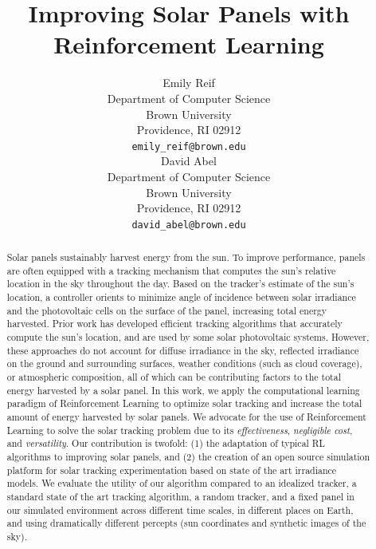 \documentclass[11pt]{article}
\title{Improving Solar Panels with Reinforcement Learning}
\author{
Emily Reif \\
Department of Computer Science\\
Brown University\\
Providence, RI 02912 \\
\texttt{emily\_reif@brown.edu} \\
\And
David Abel \\
Department of Computer Science\\
Brown University \\
Providence, RI 02912 \\
\texttt{david\_abel@brown.edu} \\
}
\date{}
\begin{document}
\maketitle

\begin{abstract}
Solar panels sustainably harvest energy from the sun. To improve performance, panels are often equipped with a tracking mechanism that computes the sun's relative location in the sky throughout the day. Based on the tracker's estimate of the sun's location, a controller orients to minimize angle of incidence between solar irradiance and the photovoltaic cells on the surface of the panel, increasing total energy harvested. Prior work has developed efficient tracking algorithms that accurately compute the sun's location, and are used by some solar photovoltaic systems.
%
However, these approaches do not account for diffuse irradiance in the sky, reflected irradiance on the ground and surrounding surfaces, weather conditions (such as cloud coverage), or atmospheric composition, all of which can be contributing factors to the total energy harvested by a solar panel.
%
In this work, we apply the computational learning paradigm of Reinforcement Learning to optimize solar tracking and increase the total amount of energy harvested by solar panels. We advocate for the use of Reinforcement Learning to solve the solar tracking problem due to its {\it effectiveness}, {\it negligible cost}, and {\it versatility}. Our contribution is twofold: (1) the adaptation of typical RL algorithms to improving solar panels, and (2) the creation of an open source simulation platform for solar tracking experimentation based on state of the art irradiance models. We evaluate the utility of our algorithm compared to an idealized tracker, a standard state of the art tracking algorithm, a random tracker, and a fixed panel in our simulated environment across different time scales, in different places on Earth, and using dramatically different percepts (sun coordinates and synthetic images of the sky).
\end{abstract}




\startmain

\newpage
\end{document}
